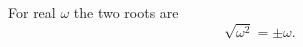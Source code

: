 \documentclass{article}
\begin{document}
For real $\omega$ the two roots are
\begin{equation}
\sqrt{\omega^2} = \pm\omega .
\label{eq:pm}
\end{equation}
\end{document}

